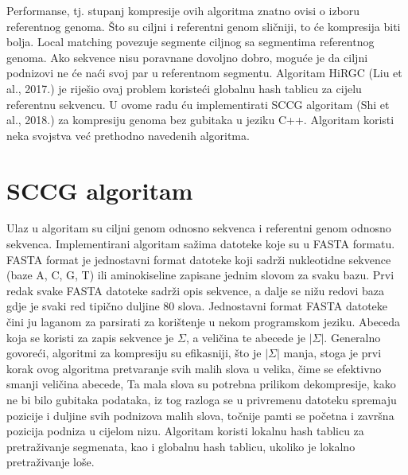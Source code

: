 \documentclass[times, utf8, diplomski]{fer}
\begin{document}
Performanse, tj. stupanj kompresije ovih algoritma znatno ovisi o izboru referentnog genoma. Što su ciljni i referentni genom sličniji, to će kompresija biti bolja. Local matching povezuje segmente ciljnog sa segmentima referentnog genoma. Ako sekvence nisu poravnane dovoljno dobro, moguće je da ciljni podnizovi ne će naći svoj par u referentnom segmentu. Algoritam HiRGC (Liu et al., 2017.) je riješio ovaj problem koristeći globalnu hash tablicu za cijelu referentnu sekvencu. U ovome radu ću implementirati SCCG algoritam (Shi et al., 2018.) za kompresiju genoma bez gubitaka u jeziku C++. Algoritam koristi neka svojstva već prethodno navedenih algoritma.

\section{SCCG algoritam}
Ulaz u algoritam su ciljni genom odnosno sekvenca i referentni genom odnosno sekvenca. Implementirani algoritam sažima datoteke koje su u FASTA formatu. FASTA format je jednostavni format datoteke koji sadrži nukleotidne sekvence (baze A, C, G, T) ili aminokiseline zapisane jednim slovom za svaku bazu. Prvi redak svake FASTA datoteke sadrži opis sekvence, a dalje se nižu redovi baza gdje je svaki red tipično duljine 80 slova. Jednostavni format FASTA datoteke čini ju laganom za parsirati za korištenje u nekom programskom jeziku. Abeceda koja se koristi za zapis sekvence je $\Sigma$, a veličina te abecede je $|\Sigma|$. Generalno govoreći, algoritmi za kompresiju su efikasniji, što je $|\Sigma|$ manja, stoga je prvi korak ovog algoritma pretvaranje svih malih slova u velika, čime se efektivno smanji veličina abecede, Ta mala slova su potrebna prilikom dekompresije, kako ne bi bilo gubitaka podataka, iz tog razloga se u privremenu datoteku spremaju pozicije i duljine svih podnizova malih slova, točnije pamti se početna i završna pozicija podniza u cijelom nizu. Algoritam koristi lokalnu hash tablicu za pretraživanje segmenata, kao i globalnu hash tablicu, ukoliko je lokalno pretraživanje loše. 
\end{document}
